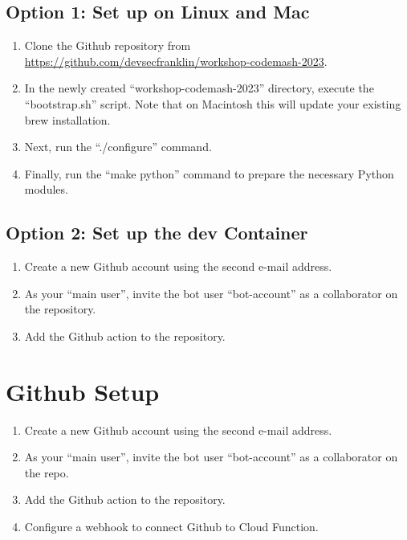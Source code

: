 \subsection{\label{sec:dev-linux}Option 1: Set up on Linux and Mac}

\justifying
\begin{raggedright}
    \begin{enumerate}
        \item Clone the Github repository from \href{https://github.com/devsecfranklin/workshop-codemash-2023}{https://github.com/devsecfranklin/workshop-codemash-2023}.
        \item In the newly created ``workshop-codemash-2023'' directory, execute the ``bootstrap.sh'' script. Note that on Macintosh this will update your existing brew installation.
        \item Next, run the ``./configure'' command.
        \item Finally, run the ``make python'' command to prepare the necessary Python modules.
    \end{enumerate}
\end{raggedright}
\vspace{2mm}

\subsection{\label{sec:dev-container}Option 2: Set up the dev Container}

\justifying
\begin{raggedright}
    \begin{enumerate}
        \item Create a new Github account using the second e-mail address.
        \item As your ``main user'', invite the bot user ``bot-account'' as a collaborator on the repository.
        \item Add the Github action to the repository.
    \end{enumerate}
\end{raggedright}
\vspace{2mm}

\section{\label{sec:github}Github Setup}


\justifying
\begin{raggedright}
	\begin{enumerate}
		\item Create a new Github account using the second e-mail address.
		\item As your ``main user'', invite the bot user ``bot-account'' as a collaborator on the repo.
		\item Add the Github action to the repository.
		\item Configure a webhook to connect Github to Cloud Function.
	\end{enumerate}
\end{raggedright}
\vspace{2mm}

